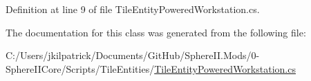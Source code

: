 Definition at line 9 of file Tile\+Entity\+Powered\+Workstation.\+cs.



The documentation for this class was generated from the following file\+:\begin{DoxyCompactItemize}
\item 
C\+:/\+Users/jkilpatrick/\+Documents/\+Git\+Hub/\+Sphere\+I\+I.\+Mods/0-\/\+Sphere\+I\+I\+Core/\+Scripts/\+Tile\+Entities/\mbox{\hyperlink{_tile_entity_powered_workstation_8cs}{Tile\+Entity\+Powered\+Workstation.\+cs}}\end{DoxyCompactItemize}
